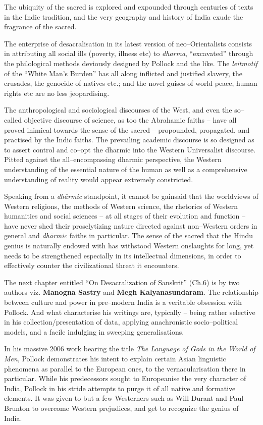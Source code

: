 The ubiquity of the sacred is explored and expounded through centuries of texts in the Indic tradition, and the very geography and history of India exude the fragrance of the sacred.

The enterprise of desacralisation in its latest version of neo–Orientalists consists in attributing all social ills (poverty, illness etc) to \textit{dharma}, “excavated” through the philological methods deviously designed by Pollock and the like. The \textit{leitmotif} of the “White Man’s Burden” has all along inflicted and justified slavery, the crusades, the genocide of natives etc.; and the novel guises of world peace, human rights etc are no less jeopardising.

The anthropological and sociological discourses of the West, and even the so–called objective discourse of science, as too the Abrahamic faiths – have all proved inimical towards the sense of the sacred – propounded, propagated, and practised by the Indic faiths. The prevailing academic discourse is so designed as to assert control and co–opt the dharmic into the Western Universalist discourse. Pitted against the all–encompassing dharmic perspective, the Western understanding of the essential nature of the human as well as a comprehensive understanding of reality would appear extremely constricted.

Speaking from a \textit{dhārmic} standpoint, it cannot be gainsaid that the worldviews of Western religions, the methods of Western science, the rhetorics of Western humanities and social sciences – at all stages of their evolution and function – have never shed their proselytizing nature directed against non–Western orders in general and \textit{dhārmic} faiths in particular. The sense of the sacred that the Hindu genius is naturally endowed with has withstood Western onslaughts for long, yet needs to be strengthened especially in its intellectual dimensions, in order to effectively counter the civilizational threat it encounters.

The next chapter entitled “On Desacralization of Sanskrit” (Ch.6) is by two authors viz. \textbf{Manogna Sastry} and \textbf{Megh Kalyanasundaram}. The relationship between culture and power in pre–modern India is a veritable obsession with Pollock. And what characterise his writings are, typically – being rather selective in his collection/presentation of data, applying anachronistic socio–political models, and a facile indulging in sweeping generalisations.

In his massive 2006 work bearing the title \textit{The Language of Gods in the World of Men}, Pollock demonstrates his intent to explain certain Asian linguistic phenomena as parallel to the European ones, to the vernacularisation there in particular. While his predecessors sought to Europeanise the very character of India, Pollock in his stride attempts to purge it of all native and formative elements. It was given to but a few Westerners such as Will Durant and Paul Brunton to overcome Western prejudices, and get to recognize the genius of India.

